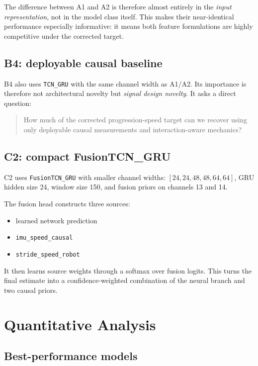 \documentclass[11pt,a4paper]{article}
\begin{document}
The difference between A1 and A2 is therefore almost entirely in the \emph{input representation}, not in the model class itself.
This makes their near-identical performance especially informative: it means both feature formulations are highly competitive under the corrected target.

\subsection{B4: deployable causal baseline}

B4 also uses \texttt{TCN\_GRU} with the same channel width as A1/A2.
Its importance is therefore not architectural novelty but \emph{signal design novelty}.
It asks a direct question:

\begin{quote}
How much of the corrected progression-speed target can we recover using only deployable causal measurements and interaction-aware mechanics?
\end{quote}

\subsection{C2: compact FusionTCN\_GRU}

C2 uses \texttt{FusionTCN\_GRU} with smaller channel widths:
\([24,24,48,48,64,64]\), GRU hidden size 24, window size 150, and fusion priors on channels 13 and 14.

The fusion head constructs three sources:
\begin{itemize}
\item learned network prediction
\item \texttt{imu\_speed\_causal}
\item \texttt{stride\_speed\_robot}
\end{itemize}

It then learns source weights through a softmax over fusion logits.
This turns the final estimate into a confidence-weighted combination of the neural branch and two causal priors.

\section{Quantitative Analysis}

\subsection{Best-performance models}
\end{document}
